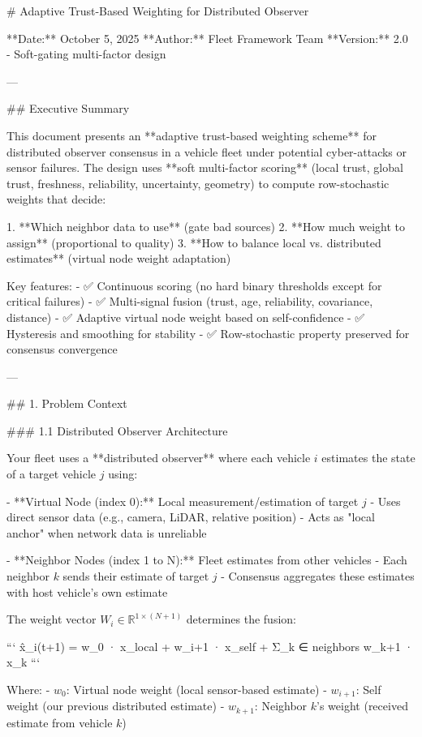 # Adaptive Trust-Based Weighting for Distributed Observer

**Date:** October 5, 2025  
**Author:** Fleet Framework Team  
**Version:** 2.0 - Soft-gating multi-factor design

---

## Executive Summary

This document presents an **adaptive trust-based weighting scheme** for distributed observer consensus in a vehicle fleet under potential cyber-attacks or sensor failures. The design uses **soft multi-factor scoring** (local trust, global trust, freshness, reliability, uncertainty, geometry) to compute row-stochastic weights that decide:

1. **Which neighbor data to use** (gate bad sources)
2. **How much weight to assign** (proportional to quality)
3. **How to balance local vs. distributed estimates** (virtual node weight adaptation)

Key features:
- ✅ Continuous scoring (no hard binary thresholds except for critical failures)
- ✅ Multi-signal fusion (trust, age, reliability, covariance, distance)
- ✅ Adaptive virtual node weight based on self-confidence
- ✅ Hysteresis and smoothing for stability
- ✅ Row-stochastic property preserved for consensus convergence

---

## 1. Problem Context

### 1.1 Distributed Observer Architecture

Your fleet uses a **distributed observer** where each vehicle \(i\) estimates the state of a target vehicle \(j\) using:

- **Virtual Node (index 0):** Local measurement/estimation of target \(j\)
  - Uses direct sensor data (e.g., camera, LiDAR, relative position)
  - Acts as "local anchor" when network data is unreliable
  
- **Neighbor Nodes (index 1 to N):** Fleet estimates from other vehicles
  - Each neighbor \(k\) sends their estimate of target \(j\)
  - Consensus aggregates these estimates with host vehicle's own estimate

The weight vector \(W_i \in \mathbb{R}^{1 \times (N+1)}\) determines the fusion:

```
x̂_i(t+1) = w_0 · x_local + w_{i+1} · x_self + Σ_{k ∈ neighbors} w_{k+1} · x_k
```

Where:
- \(w_0\): Virtual node weight (local sensor-based estimate)
- \(w_{i+1}\): Self weight (our previous distributed estimate)
- \(w_{k+1}\): Neighbor \(k\)'s weight (received estimate from vehicle \(k\))

